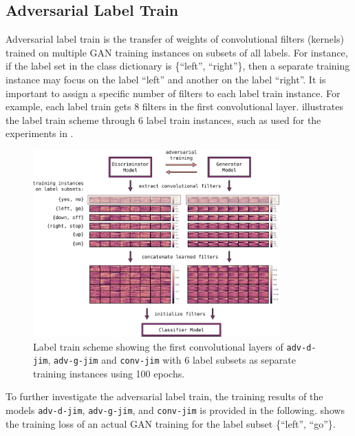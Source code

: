 \subsection{Adversarial Label Train}
Adversarial label train is the transfer of weights of convolutional filters (kernels) trained on multiple GAN training instances on subsets of all labels.
For instance, if the label set in the class dictionary is \{\enquote{left}, \enquote{right}\}, then a separate training instance may focus on the label \enquote{left} and another on the label \enquote{right}.
It is important to assign a specific number of filters to each label train instance.
For example, each label train gets 8 filters in the first convolutional layer.
 illustrates the label train scheme through 6 label train instances, such as used for the experiments in .
\begin{figure}[!ht]
  \centering
    \includegraphics[width=0.85\textwidth]{./4_nn/figs/nn_adv_label_scheme.pdf}
  \caption{Label train scheme showing the first convolutional layers of \texttt{adv-d-jim}, \texttt{adv-g-jim} and \texttt{conv-jim} with 6 label subsets as separate training instances using 100 epochs.}
  \label{fig:nn_adv_label_scheme}
\end{figure}
\FloatBarrier
\noindent
To further investigate the adversarial label train, the training results of the models \texttt{adv-d-jim}, \texttt{adv-g-jim}, and \texttt{conv-jim} is provided in the following.
 shows the training loss of an actual GAN training for the label subset \{\enquote{left}, \enquote{go}\}.
